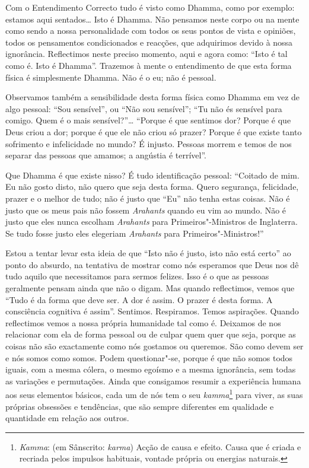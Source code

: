 Com o Entendimento Correcto tudo é visto como Dhamma, como por exemplo: estamos
aqui sentados\ldots{} Isto é Dhamma. Não pensamos neste corpo ou na mente como
sendo a nossa personalidade com todos os seus pontos de vista e opiniões, todos
os pensamentos condicionados e reacções, que adquirimos devido à nossa
ignorância. Reflectimos neste preciso momento, aqui e agora como: “Isto é tal
como é. Isto é Dhamma”. Trazemos à mente o entendimento de que esta forma física
é simplesmente Dhamma. Não é o eu; não é pessoal.

Observamos também a sensibilidade desta forma física como Dhamma em vez de algo
pessoal: “Sou sensível”, ou “Não sou sensível”; “Tu não és sensível para comigo.
Quem é o mais sensível?”\ldots{} “Porque é que sentimos dor? Porque é que Deus
criou a dor; porque é que ele não criou só prazer? Porque é que existe tanto
sofrimento e infelicidade no mundo? É injusto. Pessoas morrem e temos de nos
separar das pessoas que amamos; a angústia é terrível”.

Que Dhamma é que existe nisso? É tudo identificação pessoal: “Coitado de mim. Eu
não gosto disto, não quero que seja desta forma. Quero segurança, felicidade,
prazer e o melhor de tudo; não é justo que “Eu” não tenha estas coisas. Não é
justo que os meus pais não fossem \emph{Arahants} quando eu vim ao mundo. Não é
justo que eles nunca escolham \emph{Arahants} para Primeiros"-Ministros de
Inglaterra. Se tudo fosse justo eles elegeriam \emph{Arahants} para
Primeiros"-Ministros!”

Estou a tentar levar esta ideia de que “Isto não é justo, isto não está certo”
ao ponto do absurdo, na tentativa de mostrar como nós esperamos que Deus nos dê
tudo aquilo que necessitamos para sermos felizes. Isso é o que as pessoas
geralmente pensam ainda que não o digam. Mas quando reflectimos, vemos que “Tudo
é da forma que deve ser. A dor é assim. O prazer é desta forma. A consciência cognitiva 
é assim”. Sentimos. Respiramos. Temos aspirações. Quando reflectimos vemos a nossa
própria humanidade tal como é. Deixamos de nos relacionar com ela de forma
pessoal ou de culpar quem quer que seja, porque as coisas não são exactamente
como nós gostamos ou queremos. São como devem ser e nós somos como somos. Podem
questionar"-se, porque é que não somos todos iguais, com a mesma cólera, o mesmo
egoísmo e a mesma ignorância, sem todas as variações e permutações. Ainda que
consigamos resumir a experiência humana aos seus elementos básicos, cada um de
nós tem o seu \emph{kamma}\footnote{%
  \emph{Kamma}: (em Sânscrito: \emph{karma}) Acção de causa e efeito. Causa que
  é criada e recriada pelos impulsos habituais, vontade própria ou energias
  naturais.} para viver, as suas próprias obsessões e tendências, que são sempre
diferentes em qualidade e quantidade em relação aos outros.

